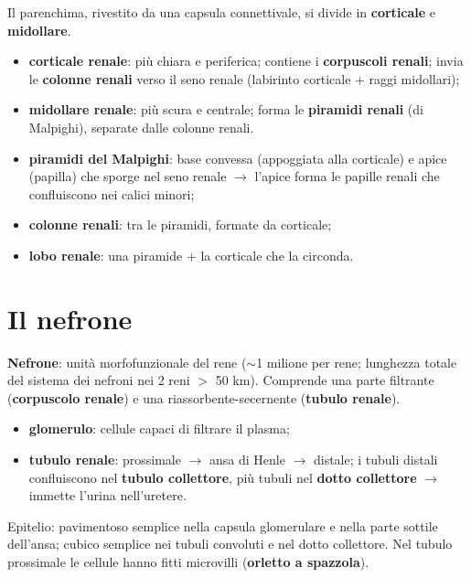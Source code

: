 Il parenchima, rivestito da una capsula connettivale, si divide in \textbf{corticale} e
\textbf{midollare}.
\begin{itemize}
  \item \textbf{corticale renale}: più chiara e periferica; contiene i \textbf{corpuscoli renali};
    invia le \textbf{colonne renali} verso il seno renale (labirinto corticale + raggi midollari);
  \item \textbf{midollare renale}: più scura e centrale; forma le \textbf{piramidi renali} (di
    Malpighi), separate dalle colonne renali.
\end{itemize}

\begin{itemize}
  \item \textbf{piramidi del Malpighi}: base convessa (appoggiata alla corticale) e apice (papilla)
    che sporge nel seno renale $\rightarrow$ l'apice forma le papille renali che confluiscono nei
    calici minori;
  \item \textbf{colonne renali}: tra le piramidi, formate da corticale;
  \item \textbf{lobo renale}: una piramide + la corticale che la circonda.
\end{itemize}

\section{Il nefrone}

\textbf{Nefrone}: unità morfofunzionale del rene ($\sim$1 milione per rene; lunghezza totale del
sistema dei nefroni nei 2 reni $>$ 50 km). Comprende una parte filtrante (\textbf{corpuscolo renale})
e una riassorbente-secernente (\textbf{tubulo renale}).
\begin{itemize}
  \item \textbf{glomerulo}: cellule capaci di filtrare il plasma;
  \item \textbf{tubulo renale}: prossimale $\rightarrow$ ansa di Henle $\rightarrow$ distale; i
    tubuli distali confluiscono nel \textbf{tubulo collettore}, più tubuli nel \textbf{dotto
    collettore} $\rightarrow$ immette l'urina nell'uretere.
\end{itemize}
Epitelio: pavimentoso semplice nella capsula glomerulare e nella parte sottile dell'ansa; cubico
semplice nei tubuli convoluti e nel dotto collettore. Nel tubulo prossimale le cellule hanno fitti
microvilli (\textbf{orletto a spazzola}).

